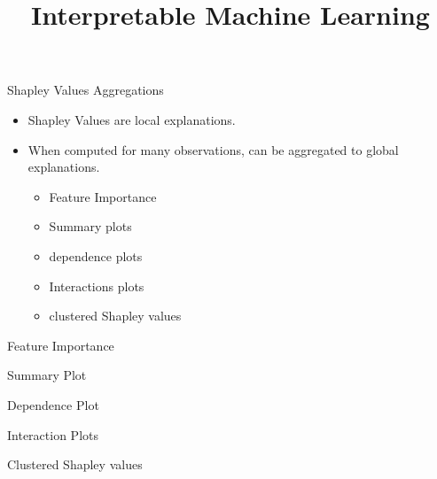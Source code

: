 \documentclass[10pt,compress,t,notes=noshow, xcolor=table]{beamer}
\title{Interpretable Machine Learning}
\date{}
\begin{document}


\begin{vbframe}{Shapley Values Aggregations}

  \begin{itemize}
    \item Shapley Values are local explanations.
    \item When computed for many observations, can be aggregated to global explanations.
      \begin{itemize}
        \item Feature Importance
        \item Summary plots
        \item dependence plots
        \item Interactions plots
        \item clustered Shapley values
      \end{itemize}
  \end{itemize}
\end{vbframe}

\begin{vbframe}{Feature Importance}
\end{vbframe}

\begin{vbframe}{Summary Plot}
\end{vbframe}

\begin{vbframe}{Dependence Plot}
\end{vbframe}

\begin{vbframe}{Interaction Plots}
\end{vbframe}

\begin{vbframe}{Clustered Shapley values}
\end{vbframe}





\endlecture
\end{document}
